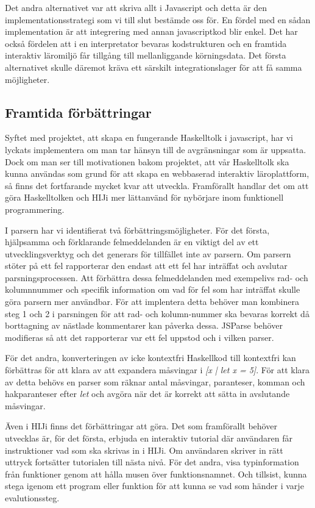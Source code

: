 Det andra alternativet var att skriva allt i Javascript och detta är den
implementationsstrategi som vi till slut bestämde oss för.
En fördel med en sådan implementation är att integrering med annan
javascriptkod blir enkel.
Det har också fördelen att i en interpretator bevaras kodstrukturen och en framtida interaktiv läromiljö får tillgång till mellanliggande körningsdata.
Det första alternativet skulle däremot kräva ett
särskilt integrationslager för att få samma möjligheter.



\subsection{Framtida förbättringar}

Syftet med projektet, att skapa en fungerande Haskelltolk i javascript, har vi lyckats implementera om man tar hänsyn till de avgränsningar som är uppsatta. Dock om man ser till motivationen bakom projektet, att vår Haskelltolk ska kunna användas som grund för att skapa en webbaserad interaktiv läroplattform, så finns det fortfarande mycket kvar att utveckla. Framförallt handlar det om att göra Haskelltolken och HIJi mer lättanvänd för nybörjare inom funktionell programmering.

I parsern har vi identifierat två förbättringsmöjligheter. För det första, hjälpsamma och förklarande felmeddelanden är en viktigt del av ett utvecklingsverktyg och det generars för tillfället inte av parsern. 
Om parsern stöter på ett fel rapporterar den endast att ett fel har inträffat och avslutar parsningsprocessen. 
Att förbättra dessa felmeddelanden med exempelivs rad- och kolumnnummer och specifik information om vad för fel som har inträffat skulle göra parsern mer användbar.
För att implentera detta behöver man kombinera steg 1 och 2 i parsningen för att rad- och kolumn-nummer ska bevaras korrekt då borttagning av nästlade kommentarer kan påverka dessa.
JSParse behöver modifieras så att det rapporterar var ett fel uppstod och i vilken parser.

För det andra, konverteringen av icke kontextfri Haskellkod till kontextfri kan förbättras 
för att klara av att expandera måsvingar i \emph{[x | let x = 5]}. 
För att klara av detta behövs en parser som räknar antal måsvingar, paranteser, 
komman och hakparanteser efter \emph{let} och avgöra när det är korrekt att sätta in avslutande måsvingar.

Även i HIJi finns det förbättringar att göra.
Det som framförallt behöver utvecklas är, för det första, erbjuda en interaktiv tutorial där användaren får instruktioner vad som ska skrivas in i HIJi. Om användaren skriver in rätt uttryck fortsätter tutorialen till nästa nivå.
För det andra, visa typinformation från funktioner genom att hålla musen över funktionsnamnet.
Och tillsist, kunna stega igenom ett program eller funktion för att kunna se vad som händer i varje evalutionssteg. 
